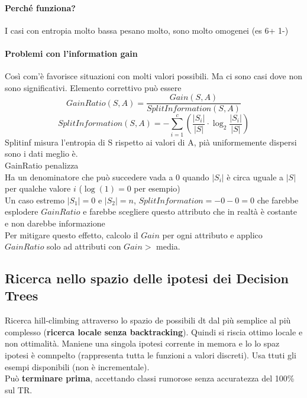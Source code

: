 \documentclass[10pt]{book}
\begin{document}
\paragraph{Perché funziona?} I casi con entropia molto bassa pesano molto, sono molto omogenei (es 6+ 1-)
\paragraph{Problemi con l'information gain} Così com'è favorisce situazioni con molti valori possibili. Ma ci sono casi dove non sono significativi. %
Elemento correttivo può essere $$GainRatio(S,A) = \frac{Gain(S,A)}{SplitInformation(S,A)}$$
$$SplitInformation(S,A) = -\sum_{i=1}^c\left( \frac{|S_i|}{|S|} \cdot \log_2 \frac{|S_i|}{|S|} \right)$$
Splitinf misura l'entropia di S rispetto ai valori di A, pià uniformemente dispersi sono i dati meglio è.\\
GainRatio penalizza\\ %
Ha un denominatore che può succedere vada a 0 quando $|S_i|$ è circa uguale a $|S|$ per qualche valore $i$ ($\log(1) = 0$ per esempio)\\
Un caso estremo $|S_1|=0$ e $|S_2| = n$, $SplitInformation = -0 -0 = 0$ che farebbe esplodere $GainRatio$ e farebbe scegliere questo attributo che in realtà è costante e non darebbe informazione\\
Per mitigare questo effetto, calcolo il $Gain$ per ogni attributo e applico $GainRatio$ solo ad attributi con $Gain >$ media.
\subsection{Ricerca nello spazio delle ipotesi dei Decision Trees}
Ricerca hill-climbing attraverso lo spazio de possibili dt dal più semplice al più complesso (\textbf{ricerca locale senza backtracking}). Quindi si riscia ottimo locale e non ottimalità. Maniene una singola ipotesi corrente in memora e lo lo spaz ipotesi è comnpelto (rappresenta tutta le funzioni a valori discreti). Usa ttuti gli esempi disponibili (non è incrementale).\\
Può \textbf{terminare prima}, accettando classi rumorose senza accuratezza del 100\% sul TR.
\end{document}

